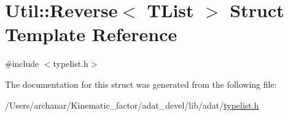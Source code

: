\hypertarget{structUtil_1_1TL_1_1Reverse}{}\section{Util\+:\+:Reverse$<$ T\+List $>$ Struct Template Reference}
\label{structUtil_1_1TL_1_1Reverse}


{\ttfamily \#include $<$typelist.\+h$>$}



The documentation for this struct was generated from the following file\+:\begin{DoxyCompactItemize}
\item 
/\+Users/archanar/\+Kinematic\+\_\+factor/adat\+\_\+devel/lib/adat/\mbox{\hyperlink{lib_2adat_2typelist_8h}{typelist.\+h}}\end{DoxyCompactItemize}
